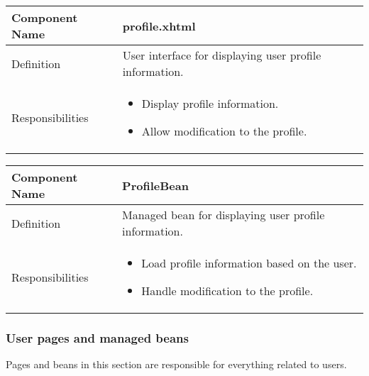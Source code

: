 \documentclass[a4paper,12pt]{book}
\begin{document}
\begin{center}
  \begin{tabular}{ | p{3.3cm} | p{11.7cm} | }
    \hline
    Component Name & \textbf{profile.xhtml} \\ \hline
    Definition & User interface for displaying user profile information. \\ \hline
    Responsibilities & \parbox{0.65\textwidth}{
      \begin{itemize}[noitemsep,leftmargin=*]
        \item Display profile information.
        \item Allow modification to the profile.
      \end{itemize}} \\ \hline
    \end{tabular}
  \end{center}
\begin{center}
  \begin{tabular}{ | p{3.3cm} | p{11.7cm} | }
    \hline
    Component Name & \textbf{ProfileBean} \\ \hline
    Definition & Managed bean for displaying user profile information. \\ \hline
    Responsibilities & \parbox{0.65\textwidth}{
      \begin{itemize}[noitemsep,leftmargin=*]
        \item Load profile information based on the user.
        \item Handle modification to the profile.
      \end{itemize}} \\ \hline
    \end{tabular}
  \end{center}

\subsubsection{User pages and managed beans}
Pages and beans in this section are responsible for everything related to users.
\end{document}
